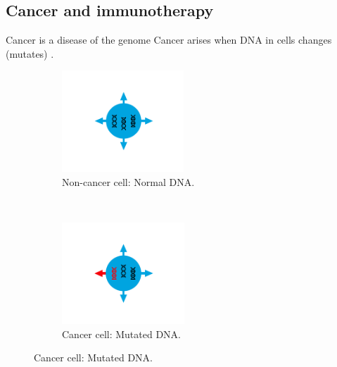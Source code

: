 \documentclass{beamer}
\begin{document}
\subsection{Cancer and immunotherapy}
\begin{frame}{Cancer is a disease of the genome}
Cancer arises when DNA in cells changes (mutates) \citep{hanahan_hallmarks_2011}.
\begin{figure}[t!]
    \centering
    \begin{subfigure}[t]{0.45\textwidth}
        \centering
        \includegraphics[height=1.5in]{figures/IC1.png}
        \caption{Non-cancer cell: Normal DNA.}
    \end{subfigure}
    ~ 
    \begin{subfigure}[t]{0.45\textwidth}
        \centering
        \includegraphics[height=1.5in]{figures/IC2.png}
        \caption{Cancer cell: Mutated DNA.}
    \end{subfigure}
\end{figure}
\end{frame}
\end{document}

